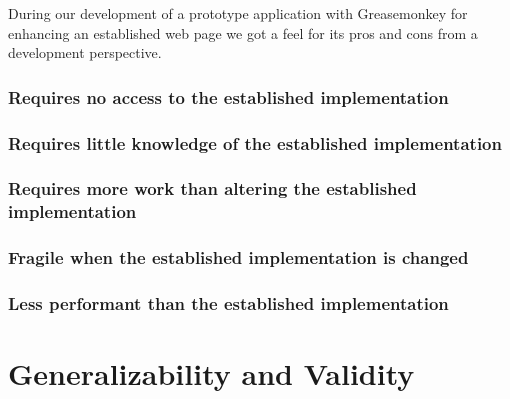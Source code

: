 
\parabreak

During our development of a prototype application with Greasemonkey for
enhancing an established web page we got a feel for its pros and cons from a
development perspective.

\subsubsection{Requires no access to the established implementation}

\subsubsection{Requires little knowledge of the established implementation}

\subsubsection{Requires more work than altering the established
  implementation}

\subsubsection{Fragile when the established implementation is changed}

\subsubsection{Less performant than the established implementation}

\section{Generalizability and Validity}

%
%
%
